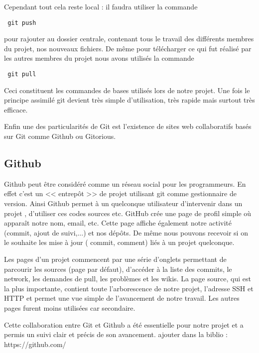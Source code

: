 Cependant tout cela reste local : il faudra utiliser la commande
\begin{verbatim} git push \end{verbatim}
pour rajouter au dossier centrale, contenant tous le travail des diff\'erents membres du projet, nos nouveaux fichiers. 
De m\^eme pour t\'el\'echarger ce qui fut r\'ealis\'e par les autres membres 
du projet nous avons utilis\'es la commande
\begin{verbatim} git pull \end{verbatim}

Ceci constituent les commandes de bases utilis\'es lors de notre projet. Une fois le principe assimil\'e git devient tr\`es simple d'utilisation,
 tr\`es rapide mais surtout tr\`es efficace.

Enfin une des particularit\'es de Git est l'existence de sites web collaboratifs bas\'es sur Git comme  Github ou Gitorious. 

\subsection{Github}

Github peut \^etre consid\'er\'e comme un r\'eseau social pour les programmeurs. En effet c'est un << entrep\^ot >> de projet utilisant git comme 
gestionnaire de version. Ainsi Github permet \`a un quelconque utilisateur d'intervenir dans un projet , d'utiliser ces codes sources etc.
GitHub cr\'ee une page de profil simple o\`u appara\^it notre nom, email, etc. Cette page affiche \'egalement notre activit\'e (commit, ajout de suivi,...)
 et nos d\'ep\^ots. De m\^eme nous pouvons recevoir si on le souhaite les mise \`a  jour ( commit, comment) li\'es \`a un projet quelconque.

Les pages d'un projet commencent par une s\'erie d'onglets permettant de parcourir les sources (page par d\'efaut), d'acc\'eder \`a la liste des
 commits, le network, les demandes de pull, les probl\`emes et les wikis.
La page source, qui est la plus importante, contient toute l'arborescence de notre projet, l'adresse SSH et HTTP et permet une vue simple
 de l'avancement de notre travail.
Les autres pages furent moins utilis\'ees car secondaire. 

Cette collaboration entre Git et Github a \'et\'e essentielle pour notre projet et a permis un suivi clair et pr\'ecis de son avancement.
\newline
\newline
\newline
\newline
ajouter dans la biblio :
\newline
https://github.com/

